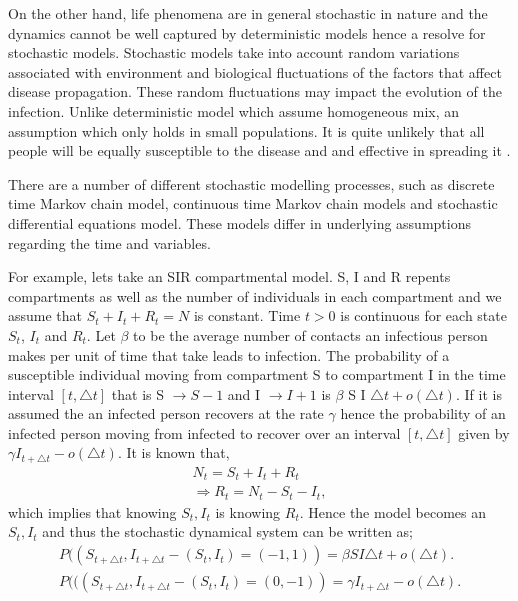 On the other hand, life phenomena are in general stochastic in nature and the dynamics cannot be well captured by deterministic models hence a resolve
for stochastic models. Stochastic models take into account random variations associated with environment and biological fluctuations of the factors that affect disease propagation. These random fluctuations may impact the evolution of the infection. Unlike deterministic model which assume homogeneous mix, an assumption which only holds in small populations. It is quite unlikely that all people will be equally susceptible to the disease and and effective in spreading it \citep{ball1985deterministic}.

  There are a number of different stochastic modelling processes, such as discrete time Markov chain model, continuous time Markov chain models and stochastic differential equations model. These models differ in underlying assumptions regarding the time and variables.
 
  For example, lets
  take an SIR compartmental model. S, I and R repents compartments as well as the number of individuals in each compartment and we assume that $S_t + I_t+ R_t = N $
  is constant. Time $t>0$ is continuous for each state $S_t$, $I_t$ and $R_t$.
  Let $\beta$ to be the average number of contacts an infectious person makes per unit of time that take leads to infection. The probability of a susceptible individual moving from compartment S to compartment I in the time interval $\left[ t,\triangle t \right]$ that is S $\rightarrow S-1$ and I $\rightarrow I + 1 $ is $ \beta$ S I $ \triangle t + o (\triangle t) $.
  If it is assumed the an infected person recovers at the rate $\gamma$ hence the probability of an infected person moving from infected to recover over an interval $\left[ t,\triangle t \right]$ given by $\gamma I_ {t + \triangle t} -o (\triangle t) $. It is known that,
 \begin{align*}
 N_t = S_t + I_t + R_t
 \\ \Rightarrow  R_t = N_t - S_t - I_t,
\end{align*}  
which implies that knowing $S_t,I_t$ is knowing $R_t$. Hence the model becomes an $S_t,I_t$ and thus the stochastic dynamical system can be written as;
 \begin{align}
 P((S_{t + \triangle t}, I_{t + \triangle t} - (S_t ,I_t) = ( - 1,1)) =  \beta S I  \triangle t + o (\triangle t).
 \\ P (((S_{t + \triangle t}, I_{t + \triangle t} - (S_t ,I_t) = ( 0,-1)) = \gamma I_{t + \triangle t} -o (\triangle t).
 \end{align} 
 
